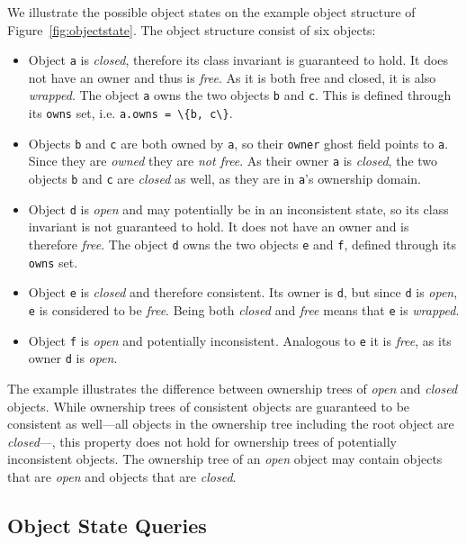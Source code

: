 \documentclass[a4paper,12pt]{article}
\newcommand{\e}[1]{\mbox{\lstinline[language=Eiffel]|#1|}}
\begin{document}
We illustrate the possible object states on the example object structure of Figure~\ref{fig:objectstate}. The object structure consist of six objects:

\begin{itemize}
\item Object \e{a} is \emph{closed}, therefore its class invariant is guaranteed to hold. It does not have an owner and thus is \emph{free}. As it is both free and closed, it is also \emph{wrapped}. The object \e{a} owns the two objects \e{b} and \e{c}. This is defined through its \e{owns} set, i.e. \e{a.owns = \{b, c\}}.

\item Objects \e{b} and \e{c} are both owned by \e{a}, so their \e{owner} ghost field points to \e{a}. Since they are \emph{owned} they are \emph{not free}. As their owner \e{a} is \emph{closed}, the two objects \e{b} and \e{c} are \emph{closed} as well, as they are in \e{a}'s ownership domain.

\item Object \e{d} is \emph{open} and may potentially be in an inconsistent state, so its class invariant is not guaranteed to hold. It does not have an owner and is therefore \emph{free}. The object \e{d} owns the two objects \e{e} and \e{f}, defined through its \e{owns} set.

\item Object \e{e} is \emph{closed} and therefore consistent. Its owner is \e{d}, but since \e{d} is \emph{open}, \e{e} is considered to be \emph{free}. Being both \emph{closed} and \emph{free} means that \e{e} is \emph{wrapped}.

\item Object \e{f} is \emph{open} and potentially inconsistent. Analogous to \e{e} it is \emph{free}, as its owner \e{d} is \emph{open}.
\end{itemize}

The example illustrates the difference between ownership trees of \emph{open} and \emph{closed} objects. While ownership trees of consistent objects are guaranteed to be consistent as well---all objects in the ownership tree including the root object are \emph{closed}---, this property does not hold for ownership trees of potentially inconsistent objects. The ownership tree of an \emph{open} object may contain objects that are \emph{open} and objects that are \emph{closed}.


\subsection{Object State Queries}
\end{document}
